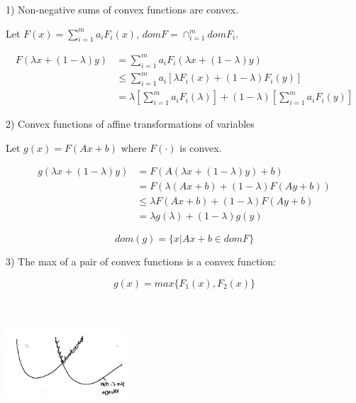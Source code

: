 1) Non-negative sums of convex functions are convex.

Let $F(x) =\sum^m_{i=1}a_iF_i(x)$, $domF = \cap^m_{i=1}domF_i$. 

\begin{align*}
F(\lambda x + (1-\lambda)y) &= \sum^m_{i=1}a_iF_i(\lambda x + (1-\lambda)y)\\
&\leq \sum^m_{i=1}a_i[\lambda F_i(x) + (1-\lambda)F_i(y)]\\
&= \lambda[\sum^m_{i=1}a_iF_i(\lambda)] + (1-\lambda)[\sum^m_{i=1}a_iF_i(y)]
\end{align*}

2) Convex functions of affine transformations of variables

Let $g(x) =F(Ax + b)$ where $F(\cdot)$ is convex.

\begin{align*}
g(\lambda x + (1-\lambda)y) &= F(A(\lambda x + (1-\lambda)y) + b)\\
&= F(\lambda(Ax + b) + (1-\lambda)F(Ay+b))\\
&\leq \lambda F(Ax + b) + (1-\lambda)F(Ay+b)\\
&= \lambda g(\lambda) + (1-\lambda)g(y)
\end{align*}

\begin{equation*}
dom(g) = \{x|Ax + b \in domF \}
\end{equation*}


3) The max of a pair of convex functions is a convex function:

\begin{equation*}
g(x) = max\{F_1(x), F_2(x) \}
\end{equation*}


\begin{marginfigure}
	\centering
	\includegraphics[width=1.8in,height=1.8in]{figures/ch08/figure1030_14.png}
\end{marginfigure}

